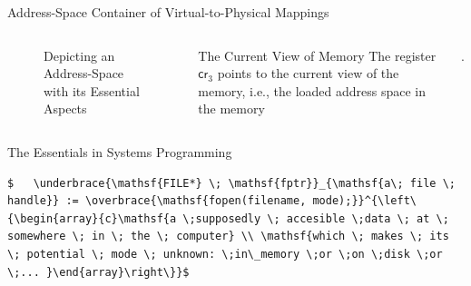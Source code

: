 \documentclass[aspectratio=169,xcolor=dvipsnames]{beamer}
\begin{document}
\begin{frame}{Address-Space  Container of Virtual-to-Physical Mappings}
\begin{columns}[c]
\begin{figure}
\begin{tikzpicture}[x=0.75pt,y=0.75pt,yscale=-0.7,xscale=0.7]
\end{tikzpicture}
    \caption{Depicting an Address-Space with its Essential Aspects}
    \label{fig:enter-label}
\end{figure}
  \begin{block}{The Current View of Memory}
    The register $\mathsf{cr}_3$ points to the current view of the memory, i.e., the loaded address space in the memory \end{block}.
\end{columns}

\end{frame}

\begin{frame}[fragile]{The Essentials in Systems Programming}
\begin{lstlisting}[style=CStyle,mathescape]
 $   \underbrace{\mathsf{FILE*} \; \mathsf{fptr}}_{\mathsf{a\; file \; handle}} := \overbrace{\mathsf{fopen(filename, mode);}}^{\left\{\begin{array}{c}\mathsf{a \;supposedly \; accesible \;data \; at \; somewhere \; in \; the \; computer} \\ \mathsf{which \; makes \; its \; potential \; mode \; unknown: \;in\_memory \;or \;on \;disk \;or \;... }\end{array}\right\}}$
\end{lstlisting}
\end{frame}
\end{document}
